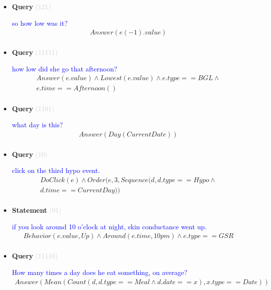 \documentclass[11pt]{article}
\newcommand{\key}[1]{\textcolor{lightgray}{#1}}
\newcounter{CQuery}
\newcounter{CStatement}
\begin{document}
\begin{itemize}
\item
\textbf{Query\theCQuery} \key{(121)} \addtocounter{CQuery}{1}
\textcolor{blue}{ so how low was it? }
\begin{multline*}
Answer(e(-1).value) \\ 
\end{multline*}


\item
\textbf{Query\theCQuery} \key{(11111)} \addtocounter{CQuery}{1}
\textcolor{blue}{ how low did she go that afternoon? }
\begin{multline*}
Answer(e.value) \wedge Lowest(e.value) \wedge e.type==BGL \wedge \\ 
e.time==Afternoon() \\ 
\end{multline*}


\item
\textbf{Query\theCQuery} \key{(1101)} \addtocounter{CQuery}{1}
\textcolor{blue}{ what day is this? }
\begin{multline*}
Answer(Day(CurrentDate)) \\ 
\end{multline*}


\item
\textbf{Query\theCQuery} \key{(10)} \addtocounter{CQuery}{1}
\textcolor{blue}{ click on the third hypo event. }
\begin{multline*}
DoClick(e) \wedge  Order(e, 3, Sequence(d, d.type==Hypo \wedge \\ 
d.time==CurrentDay)) \\ 
\end{multline*}


\item
\textbf{Statement\theCStatement} \key{(01)} \addtocounter{CStatement}{1}
\textcolor{blue}{ if you look around 10 o'clock at night, skin conductance went up. }
\begin{multline*}
Behavior(e.value, Up) \wedge Around(e.time, 10pm) \wedge e.type==GSR \\ 
\end{multline*}


\item
\textbf{Query\theCQuery} \key{(11110)} \addtocounter{CQuery}{1}
\textcolor{blue}{ How many times a day does he eat something, on average? }
\begin{multline*}
Answer(Mean(Count(d, d.type==Meal \wedge d.date==x), x.type==Date)) \\ 
\end{multline*}



\end{itemize}
\end{document}
